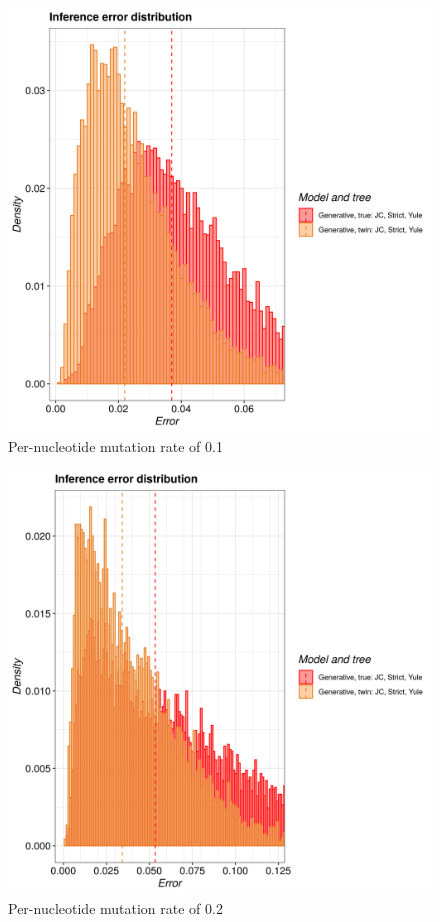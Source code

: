 \begin{figure}[H]
  \includegraphics[width=\textwidth]{pirouette_example_24/example_24_317/errors.png}
  \caption{Per-nucleotide mutation rate of 0.1}
\end{figure}

\begin{figure}[H]
  \includegraphics[width=\textwidth]{pirouette_example_24/example_24_318/errors.png}
  \caption{Per-nucleotide mutation rate of 0.2}
\end{figure}

